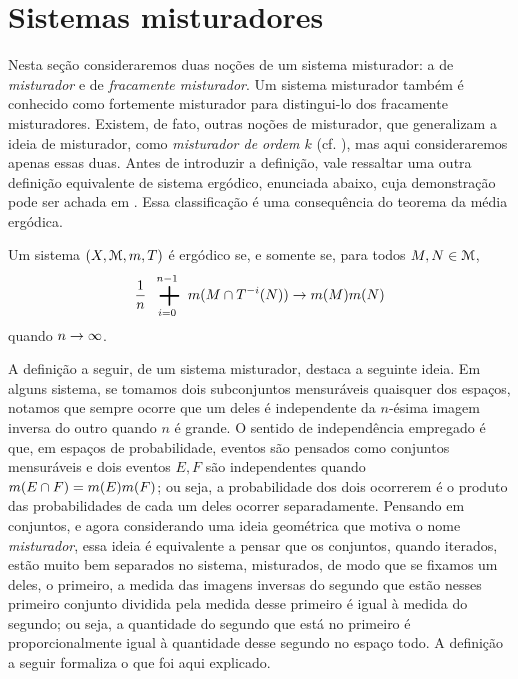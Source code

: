\section{Sistemas misturadores}

Nesta seção consideraremos duas noções de um sistema misturador: a de \emph{misturador} e de \emph{fracamente misturador}. Um sistema misturador também é conhecido como fortemente misturador para distingui-lo dos fracamente misturadores. Existem, de fato, outras noções de misturador, que generalizam a ideia de misturador, como \emph{misturador de ordem $k$} (cf. \cite{liv:EinsiedlerWard-ErgodicTheory}), mas aqui consideraremos apenas essas duas. Antes de introduzir a definição, vale ressaltar uma outra definição equivalente de sistema ergódico, enunciada abaixo, cuja demonstração pode ser achada em \cite{liv:EinsiedlerWard-ErgodicTheory}. Essa classificação é uma consequência do teorema da média ergódica.

\begin{proposition}
	Um sistema $(X,\mathcal{M},m,T)$ é ergódico se, e somente se, para todos $M,N \in \mathcal{M}$,
	\begin{equation*}
	\frac{1}{n} \sum_{i=0}^{n-1} \med(M \cap T^{-i}(N)) \conv \med(M)\med(N)
	\end{equation*}
quando $n \rightarrow \infty$.
\end{proposition}

	A definição a seguir, de um sistema misturador, destaca a seguinte ideia. Em alguns sistema, se tomamos dois subconjuntos mensuráveis quaisquer dos espaços, notamos que sempre ocorre que um deles é independente da $n$-ésima imagem inversa do outro quando $n$ é grande. O sentido de independência empregado é que, em espaços de probabilidade, eventos são pensados como conjuntos mensuráveis e dois eventos $E,F$ são independentes quando $m(E \cap F)=m(E)m(F)$; ou seja, a probabilidade dos dois ocorrerem é o produto das probabilidades de cada um deles ocorrer separadamente. Pensando em conjuntos, e agora considerando uma ideia geométrica que motiva o nome \emph{misturador}, essa ideia é equivalente a pensar que os conjuntos, quando iterados, estão muito bem separados no sistema, misturados, de modo que se fixamos um deles, o primeiro, a medida das imagens inversas do segundo que estão nesses primeiro conjunto dividida pela medida desse primeiro é igual à medida do segundo; ou seja, a quantidade do segundo que está no primeiro é proporcionalmente igual à quantidade desse segundo no espaço todo. A definição a seguir formaliza o que foi aqui explicado.

